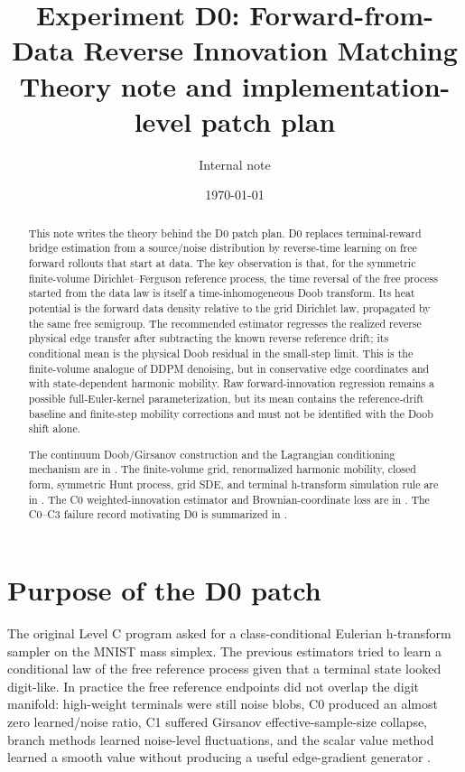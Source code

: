 \documentclass[11pt]{article}
\title{Experiment D0: Forward-from-Data Reverse Innovation Matching\\
\large Theory note and implementation-level patch plan}
\author{Internal note}
\date{\today}
\numberwithin{equation}{section}
\newcommand{\1}{\mathbf 1}
\begin{document}
\maketitle

\begin{abstract}
This note writes the theory behind the D0 patch plan.  D0 replaces terminal-reward bridge estimation from a source/noise distribution by reverse-time learning on free forward rollouts that start at data.  The key observation is that, for the symmetric finite-volume Dirichlet--Ferguson reference process, the time reversal of the free process started from the data law is itself a time-inhomogeneous Doob transform.  Its heat potential is the forward data density relative to the grid Dirichlet law, propagated by the same free semigroup.  The recommended estimator regresses the realized reverse physical edge transfer after subtracting the known reverse reference drift; its conditional mean is the physical Doob residual in the small-step limit.  This is the finite-volume analogue of DDPM denoising, but in conservative edge coordinates and with state-dependent harmonic mobility.  Raw forward-innovation regression remains a possible full-Euler-kernel parameterization, but its mean contains the reference-drift baseline and finite-step mobility corrections and must not be identified with the Doob shift alone.

The continuum Doob/Girsanov construction and the Lagrangian conditioning mechanism are in \cite[Sec.~3]{main-manuscript}.  The finite-volume grid, renormalized harmonic mobility, closed form, symmetric Hunt process, grid SDE, and terminal h-transform simulation rule are in \cite[Secs.~3--7]{eulerian-manuscript}.  The C0 weighted-innovation estimator and Brownian-coordinate loss are in \cite[Secs.~6--11]{c0-note}.  The C0--C3 failure record motivating D0 is summarized in \cite[Secs.~4--8]{experiment11-report}.
\end{abstract}

\tableofcontents

\section{Purpose of the D0 patch}

The original Level C program asked for a class-conditional Eulerian h-transform sampler on the MNIST mass simplex.  The previous estimators tried to learn a conditional law of the free reference process given that a terminal state looked digit-like.  In practice the free reference endpoints did not overlap the digit manifold: high-weight terminals were still noise blobs, C0 produced an almost zero learned/noise ratio, C1 suffered Girsanov effective-sample-size collapse, branch methods learned noise-level fluctuations, and the scalar value method learned a smooth value without producing a useful edge-gradient generator \cite[Secs.~4--8]{experiment11-report}.
\end{document}
